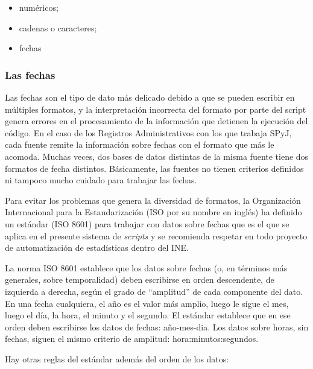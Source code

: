 \documentclass[
  spanish,
]{book}
\begin{document}
\begin{itemize}
\item
  numéricos;
\item
  cadenas o caracteres;
\item
  fechas
\end{itemize}

\hypertarget{las-fechas}{%
\subsubsection{Las fechas}\label{las-fechas}}

Las fechas son el tipo de dato más delicado debido a que se pueden escribir en múltiples formatos, y la interpretación incorrecta del formato por parte del script genera errores en el procesamiento de la información que detienen la ejecución del código. En el caso de los Registros Administrativos con los que trabaja SPyJ, cada fuente remite la información sobre fechas con el formato que más le acomoda. Muchas veces, dos bases de datos distintas de la misma fuente tiene dos formatos de fecha distintos. Básicamente, las fuentes no tienen criterios definidos ni tampoco mucho cuidado para trabajar las fechas.

Para evitar los problemas que genera la diversidad de formatos, la Organización Internacional para la Estandarización (ISO por su nombre en inglés) ha definido un estándar (ISO 8601) para trabajar con datos sobre fechas que es el que se aplica en el presente sistema de \emph{scripts} y se recomienda respetar en todo proyecto de automatización de estadísticas dentro del INE.

La norma ISO 8601 establece que los datos sobre fechas (o, en términos más generales, sobre temporalidad) deben escribirse en orden descendente, de izquierda a derecha, según el grado de ``amplitud'' de cada componente del dato. En una fecha cualquiera, el año es el valor más amplio, luego le sigue el mes, luego el día, la hora, el minuto y el segundo. El estándar establece que en ese orden deben escribirse los datos de fechas: año-mes-dia. Los datos sobre horas, sin fechas, siguen el mismo criterio de amplitud: hora:minutos:segundos.

Hay otras reglas del estándar además del orden de los datos:
\end{document}
